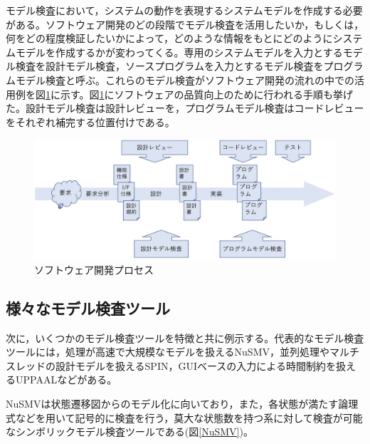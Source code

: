 \documentclass{tpu-sotu}
\begin{document}
	モデル検査において，システムの動作を表現するシステムモデルを作成する必要がある。ソフトウェア開発のどの段階でモデル検査を活用したいか，もしくは，何をどの程度検証したいかによって，どのような情報をもとにどのようにシステムモデルを作成するかが変わってくる。専用のシステムモデルを入力とするモデル検査を設計モデル検査，ソースプログラムを入力とするモデル検査をプログラムモデル検査と呼ぶ。これらのモデル検査がソフトウェア開発の流れの中での活用例を図\ref{develP}に示す。図\ref{develP}にソフトウェアの品質向上のために行われる手順も挙げた。設計モデル検査は設計レビューを，プログラムモデル検査はコードレビューをそれぞれ補完する位置付けである。
	\begin{figure}[htbp]
	\centering
	\includegraphics[width=155mm]{developmentProcess.png}
	\caption{ソフトウェア開発プロセス}
	\label{develP}
	\end{figure}
	\subsection{様々なモデル検査ツール}
	次に，いくつかのモデル検査ツールを特徴と共に例示する。代表的なモデル検査ツールには，処理が高速で大規模なモデルを扱えるNuSMV\cite{Nu}，並列処理やマルチスレッドの設計モデルを扱えるSPIN\cite{s1}，GUIベースの入力による時間制約を扱えるUPPAAL\cite{u2}などがある。
	
	NuSMVは状態遷移図からのモデル化に向いており，また，各状態が満たす論理式などを用いて記号的に検査を行う，莫大な状態数を持つ系に対して検査が可能なシンボリックモデル検査ツールである(図\ref{NuSMV})。
		
\end{document}
